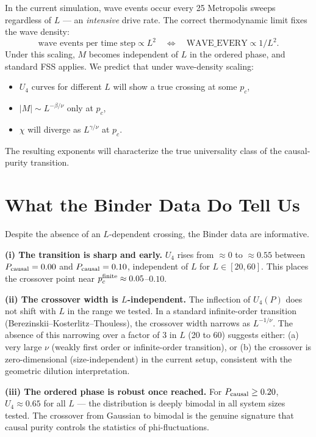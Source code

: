 \documentclass[12pt,a4paper]{article}
\begin{document}
In the current simulation, wave events occur every 25 Metropolis sweeps
regardless of $L$ --- an \emph{intensive} drive rate.
The correct thermodynamic limit fixes the wave density:
\begin{equation}
  \text{wave events per time step} \propto L^2
  \quad\Leftrightarrow\quad
  \text{WAVE\_EVERY} \propto 1/L^2.
\end{equation}
Under this scaling, $M$ becomes independent of $L$ in the ordered phase,
and standard FSS applies.
We predict that under wave-density scaling:
\begin{itemize}
  \item $U_4$ curves for different $L$ will show a true crossing at some $p_c$,
  \item $|M| \sim L^{-\beta/\nu}$ only at $p_c$,
  \item $\chi$ will diverge as $L^{\gamma/\nu}$ at $p_c$.
\end{itemize}
The resulting exponents will characterize the true universality class of
the causal-purity transition.

\section{What the Binder Data Do Tell Us}
\label{sec:binder}

Despite the absence of an $L$-dependent crossing, the Binder data are informative.

\textbf{(i) The transition is sharp and early.}
$U_4$ rises from $\approx 0$ to $\approx 0.55$ between $P_{\rm causal} = 0.00$
and $P_{\rm causal} = 0.10$, independent of $L$ for $L \in [20, 60]$.
This places the crossover point near $p_c^{\rm finite} \approx 0.05$--$0.10$.

\textbf{(ii) The crossover width is $L$-independent.}
The inflection of $U_4(P)$ does not shift with $L$ in the range we tested.
In a standard infinite-order transition (Berezinskii--Kosterlitz--Thouless),
the crossover width narrows as $L^{-1/\nu}$.
The absence of this narrowing over a factor of 3 in $L$ (20 to 60) suggests
either: (a) very large $\nu$ (weakly first order or infinite-order transition),
or (b) the crossover is zero-dimensional (size-independent) in the current setup,
consistent with the geometric dilution interpretation.

\textbf{(iii) The ordered phase is robust once reached.}
For $P_{\rm causal} \geq 0.20$, $U_4 \approx 0.65$ for all $L$ ---
the distribution is deeply bimodal in all system sizes tested.
The crossover from Gaussian to bimodal is the genuine signature that
causal purity controls the statistics of phi-fluctuations.
\end{document}
